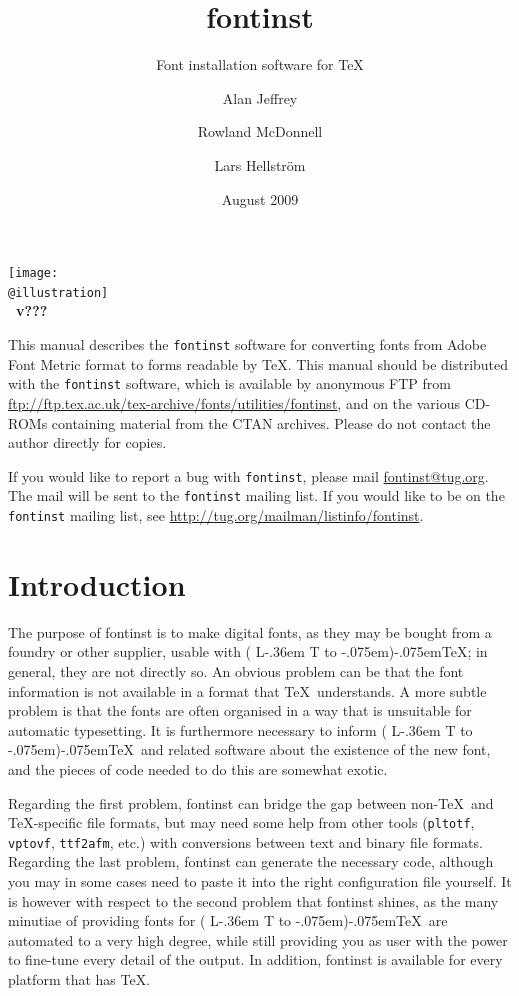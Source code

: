 \documentclass[a4paper]{ltxguide}
\title{fontinst}
\subtitle{Font installation software for \TeX}
\author{Alan Jeffrey\and Rowland McDonnell\and Lars Hellstr\"om}
\date{August 2009}
\makeatletter
\newcommand{\@subtitle}{}
\newcommand{\@version}{???}
\newcommand{\@illustration}{cover.eps}
\renewcommand{\maketitle}{{%
   \thispagestyle{empty}%
   \normalfont\centering
   \null
   {\fontsize{100}{100}\textit{\@title}}%
   \par\bigskip
   {\Large\textbf{\@subtitle}}%
   \vfill
   \texttt{[image: \\@illustration]}%
   \vfill
   {\Large\textbf{%
      \def\and{\egroup\qquad\hbox\bgroup}
      \leavevmode \hbox{\@author}\\[\smallskipamount] 
      \@title~v\@version
      \quad\textperiodcentered\quad \@date}}%
   \clearpage
}}
\newcommand{\La}{%
   L\kern-.36em
   {%
      \setbox0\hbox{T}%
      \vbox to\ht0{\hbox{%
         $\m@th$\csname S@\f@size\endcsname
         \fontsize\sf@size\z@\math@fontsfalse\selectfont
         A%
      }\vss}%
   }%
}
\DeclareRobustCommand\AllTeX{(\La\kern-.075em)\kern-.075em\TeX}
\newcommand*{\setfilename}[1]{\texttt{#1}}
\newcommand*{\setpackagename}[1]{\textsf{#1}}
\newcommand{\fontinst}{\setpackagename{font\-inst}\xspace}
\makeatother
\begin{document}
\maketitle


% 

\begin{footnotesize}
  This manual describes the \texttt{fontinst} software for converting
  fonts from Adobe Font Metric format to forms readable by \TeX.  This
  manual should be distributed with the \texttt{fontinst} software,
  which is available by anonymous FTP from
  \url{ftp://ftp.tex.ac.uk/tex-archive/fonts/utilities/fontinst}, and
  on the various CD-ROMs containing material from the CTAN archives.
  Please do not contact the author directly for copies.

  If you would like to report a bug with \texttt{fontinst}, please
  mail \url{fontinst@tug.org}.  The mail will be sent to the
  \texttt{fontinst} mailing list.  If you would like to be on the
  \texttt{fontinst} mailing list, see 
  \url{http://tug.org/mailman/listinfo/fontinst}.
\end{footnotesize}

\tableofcontents


\clearpage


\section{Introduction}

The purpose of \fontinst is to make digital fonts, as they may 
be bought from a foundry or other supplier, usable with \AllTeX; 
in general, they are not directly so. An obvious problem can be 
that the font information is not available in a format that \TeX\ 
understands. A more subtle problem is that the fonts are often 
organised in a way that is unsuitable for automatic typesetting. 
It is furthermore necessary to inform \AllTeX\ and related software 
about the existence of the new font, and the pieces of code needed 
to do this are somewhat exotic.

Regarding the first problem, \fontinst can bridge the gap between 
non-\TeX\ and \TeX-specific file formats, but may need some help from 
other tools (\setfilename{pltotf}, \setfilename{vptovf}, 
\setfilename{ttf2afm}, etc.) with conversions between text and binary 
file formats. Regarding the last problem, \fontinst can generate the 
necessary code, although you may in some cases need to paste it into 
the right configuration file yourself. It is however with respect to 
the second problem that \fontinst shines, as the many minutiae of 
providing fonts for \AllTeX\ are automated to a very high degree, 
while still providing you as user with the power to fine-tune every 
detail of the output. In addition, \fontinst is available for every 
platform that has \TeX.
\end{document}
